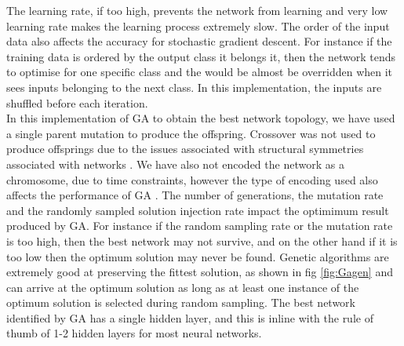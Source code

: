 The learning rate, if too high, prevents the network from learning and very low learning rate makes the learning process extremely slow. The order of the input data also affects the accuracy for stochastic gradient descent. For instance if  the training data is ordered by the output class it belongs it, then the network tends to optimise for one specific class and the would be almost be overridden  when it sees inputs belonging to the next class.  In this implementation, the inputs are shuffled before each iteration.  \\In this implementation of GA to obtain the best network topology, we have used a single parent mutation to produce the offspring. Crossover was not used to produce offsprings due to the issues associated with structural symmetries associated with networks \cite{Branke1995}. We have also not encoded the network as a chromosome, due to time constraints, however the type of encoding used also affects the performance of GA \cite{Koehn1994}. The number of generations, the mutation rate and the randomly sampled solution injection rate impact the optimimum result produced by GA. For instance if the random sampling rate or the mutation rate is too high, then the best network may not survive, and on the other hand if it is too low then the optimum solution may never be found. Genetic algorithms are extremely good at preserving the fittest solution, as shown in  fig \ref{fig:Gagen} and can arrive at the optimum solution as long as at least one instance of the optimum solution is selected during random sampling. The best network identified by GA has a single hidden layer, and this is inline with the rule of thumb of 1-2 hidden layers for most neural networks.

